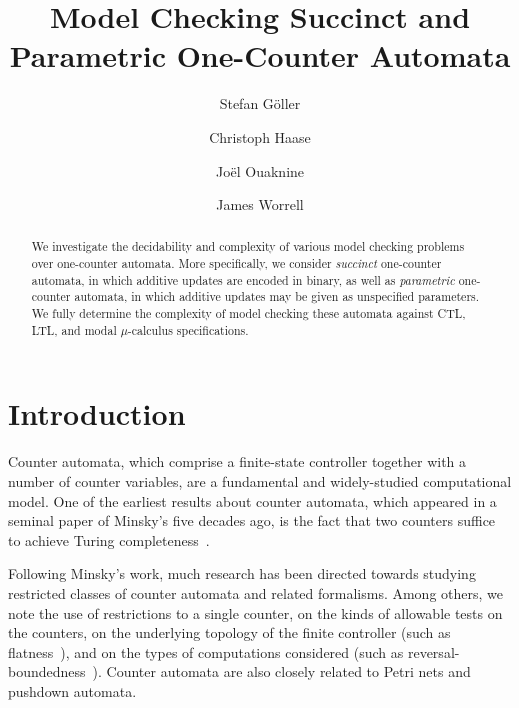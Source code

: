 \documentclass[times,envcountsame]{llncs}
\begin{document}
\title{Model Checking Succinct and Parametric One-Counter Automata}
\author{Stefan G\"oller \and
Christoph Haase \and
Jo\"el Ouaknine \and
James Worrell
}



\maketitle

\begin{abstract}
  We investigate the decidability and complexity of various model
  checking problems over one-counter automata. More specifically, we
  consider \emph{succinct} one-counter automata, in which additive
  updates are encoded in binary, as well as \emph{parametric}
  one-counter automata, in which additive updates may be given as
  unspecified parameters. We fully determine the complexity of model
  checking these automata against CTL, LTL, and modal $\mu$-calculus
  specifications.
\end{abstract}


\section{Introduction}

Counter automata, which comprise a finite-state controller together
with a number of counter variables, are a fundamental and widely-studied
computational model. One of the earliest results about counter
automata, which appeared in a seminal paper of Minsky's five decades
ago, is the fact that two counters suffice to achieve Turing
completeness~\cite{Min61}.

Following Minsky's work, much research has been directed towards
studying restricted classes of counter automata and related
formalisms. Among others, we note the use of restrictions to a single
counter, on the kinds of allowable tests on the counters, on the
underlying topology of the finite controller (such as
flatness~\cite{CJ98-cav,LS08-atva}), and on the types of computations
considered (such as reversal-boundedness~\cite{ID06-tcs}). Counter
automata are also closely related to Petri nets and pushdown automata.
\end{document}
